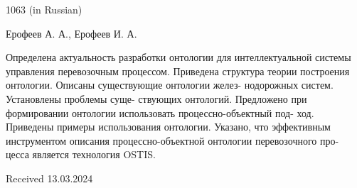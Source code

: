 \documentclass[a4paper]{article}
\begin{document}
\begin{multicols}{2}
\begin{thebibliography}{10}
1063 (in Russian)
\end{thebibliography}
\columnbreak
\begin{center} 
\fontsize{14}{10}
\fontsize{12}{15}\selectfont
\par Ерофеев А. А., Ерофеев И. А.
\end{center}
\fontsize{10}{13}\selectfont
\hspace{0.2cm} Определена актуальность разработки онтологии для
интеллектуальной системы управления перевозочным
процессом. Приведена структура теории построения
онтологии. Описаны существующие онтологии желез-
нодорожных систем. Установлены проблемы суще-
ствующих онтологий. Предложено при формировании
онтологии использовать процессно-объектный под-
ход. Приведены примеры использования онтологии.
Указано, что эффективным инструментом описания
процессно-объектной онтологии перевозочного про-
цесса является технология OSTIS.
\begin{flushright}
    Received 13.03.2024
\end{flushright}
\end{multicols}
\end{document}

